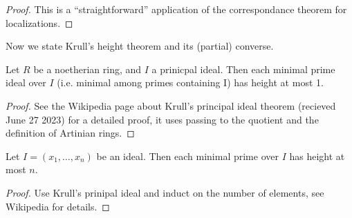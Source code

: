\begin{proof}
    This is a ``straightforward'' application of the
    correspondance theorem for localizations.
\end{proof}
    
\begin{comment}
\begin{definition}
    \label{def:primary_ideal}
    An ideal \(I\) is \(\mathfrak{p}\)-primary if it's
    radical is equal to \(\mathfrak{p}\).
\end{definition}

\begin{definition}
    \label{def:min_len_gen_set_maximal}
    \uses{def:primary_ideal}
    Let \((R,\mathfrak{m},k)\) be a local (noetherian?) ring.
    Let \(\nu(R)\)
    be the minimum of the lengths of generating sets of  
    \(\mathfrak{m}\)-primary ideals.
\end{definition}

\end{comment}

Now we state Krull's height theorem and its (partial) converse.



\begin{theorem}
    \label{thm:krull_principal_ideal}
    Let \(R\) be a noetherian ring, 
    and \(I\) a prinicpal ideal.
    Then each minimal prime ideal over \(I\) 
    (i.e. minimal among primes containing I)
    has height at most 1.
\end{theorem}

\begin{proof}
    See the Wikipedia page about Krull's principal ideal theorem
    (recieved June 27 2023) for a detailed proof,
    it uses passing to the quotient and the definition of
    Artinian rings.
\end{proof}

\begin{theorem}
    \label{thm:krull_height}
    Let \(I = (x_{1}, \ldots, x_{n})\) be an ideal. 
    Then each minimal prime over \(I\) has height
    at most \(n\).
\end{theorem}

\begin{proof}
    Use Krull's prinipal ideal and induct on the 
    number of elements, see Wikipedia for details.
\end{proof}

